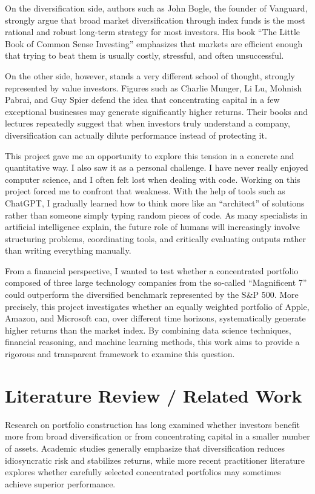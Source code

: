 \documentclass[11pt,a4paper]{article}
\begin{document}
On the diversification side, authors such as John Bogle, the founder of Vanguard, strongly argue that broad market diversification through index funds is the most rational and robust long-term strategy for most investors. His book “The Little Book of Common Sense Investing” emphasizes that markets are efficient enough that trying to beat them is usually costly, stressful, and often unsuccessful.

On the other side, however, stands a very different school of thought, strongly represented by value investors. Figures such as Charlie Munger, Li Lu, Mohnish Pabrai, and Guy Spier defend the idea that concentrating capital in a few exceptional businesses may generate significantly higher returns. Their books and lectures repeatedly suggest that when investors truly understand a company, diversification can actually dilute performance instead of protecting it.

This project gave me an opportunity to explore this tension in a concrete and quantitative way. I also saw it as a personal challenge. I have never really enjoyed computer science, and I often felt lost when dealing with code. Working on this project forced me to confront that weakness. With the help of tools such as ChatGPT, I gradually learned how to think more like an “architect” of solutions rather than someone simply typing random pieces of code. As many specialists in artificial intelligence explain, the future role of humans will increasingly involve structuring problems, coordinating tools, and critically evaluating outputs rather than writing everything manually.

From a financial perspective, I wanted to test whether a concentrated portfolio composed of three large technology companies from the so-called “Magnificent 7” could outperform the diversified benchmark represented by the S&P 500. More precisely, this project investigates whether an equally weighted portfolio of Apple, Amazon, and Microsoft can, over different time horizons, systematically generate higher returns than the market index. By combining data science techniques, financial reasoning, and machine learning methods, this work aims to provide a rigorous and transparent framework to examine this question.


\section{Literature Review / Related Work}
\label{sec:literature}

Research on portfolio construction has long examined whether investors benefit more from broad diversification or from concentrating capital in a smaller number of assets. Academic studies generally emphasize that diversification reduces idiosyncratic risk and stabilizes returns, while more recent practitioner literature explores whether carefully selected concentrated portfolios may sometimes achieve superior performance.
\end{document}
